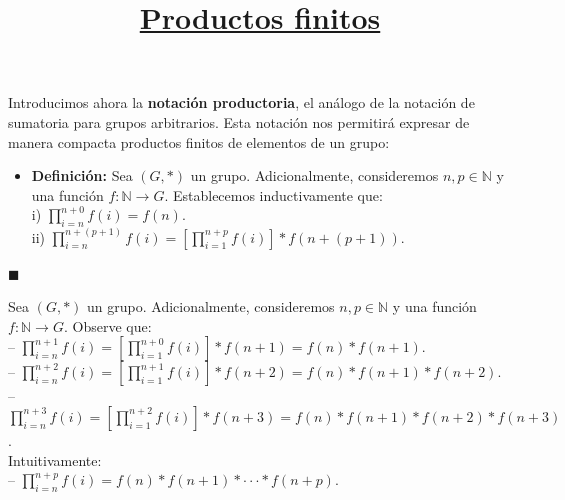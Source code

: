 \documentclass[10 pt]{article}
\title{\textbf{\underline{Productos finitos}}}
\author{}
\date{}
\begin{document}
\pagestyle{empty}
\maketitle
\thispagestyle{empty}

\section*{}

\Large{Introducimos ahora la \textbf{notación productoria}, el análogo de la notación de sumatoria para grupos arbitrarios. Esta notación nos permitirá expresar de manera compacta productos finitos de elementos de un grupo:} \\

\begin{itemize}
    \item \Large{\textbf{Definición:} Sea $(G,*)$ un grupo. Adicionalmente, consideremos $n,p \in \mathbb N$ y una función $f:\mathbb N \rightarrow G$. Establecemos inductivamente que: \\

    i) $\displaystyle \prod_{i=n}^{n+0}f(i)=f(n)$. \\

ii) $\displaystyle \prod_{i=n}^{n+(p+1)}f(i)=\left[ \displaystyle \prod_{i=1}^{n+p}f(i) \right]*f(n+(p+1))$.} \\
\end{itemize}

\begin{flushright}
    $\blacksquare$
\end{flushright}

\Large{Sea $(G,*)$ un grupo. Adicionalmente, consideremos $n,p \in \mathbb N$ y una función $f:\mathbb N \rightarrow G$. Observe que: \\

-- $\displaystyle \prod_{i=n}^{n+1}f(i)=\left[ \displaystyle \prod_{i=1}^{n+0}f(i) \right]*f(n+1)=f(n)*f(n+1)$. \\

-- $\displaystyle \prod_{i=n}^{n+2}f(i)=\left[ \displaystyle \prod_{i=1}^{n+1}f(i) \right]*f(n+2)=f(n)*f(n+1)*f(n+2)$. \\

-- $\displaystyle \prod_{i=n}^{n+3}f(i)=\left[ \displaystyle \prod_{i=1}^{n+2}f(i) \right]*f(n+3)=f(n)*f(n+1)*f(n+2)*f(n+3)$. \\

Intuitivamente: \\

-- $\displaystyle \prod_{i=n}^{n+p}f(i)=f(n)*f(n+1)* \cdot \cdot \cdot *f(n+p)$.} \\
\end{document}
